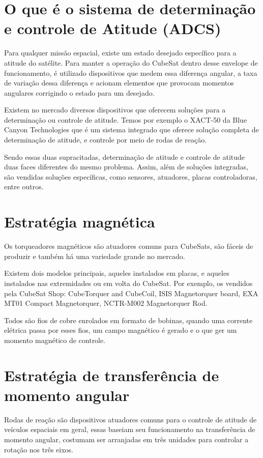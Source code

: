 \section{O que é o sistema de determinação e controle de Atitude (ADCS)}\label{sec:O que é o sistema de determinação e controle de Atitude (ADCS)}

Para qualquer missão espacial, existe um estado desejado específico para a atitude do satélite. Para manter a operação do CubeSat dentro desse envelope de funcionamento, é utilizado dispositivos que medem essa diferença angular, a taxa de variação dessa diferença e acionam elementos que provocam momentos angulares corrigindo o estado para um desejado.

Existem no mercado diversos dispositivos que oferecem soluções para a determinação ou controle de atitude. Temos por exemplo o XACT-50 da Blue Canyon Technologies que é um sistema integrado que oferece solução completa de determinação de atitude, e controle por meio de rodas de reação.

Sendo essas duas supracitadas, determinação de atitude e controle de atitude duas faces diferentes do mesmo problema. Assim, além de soluções integradas, são vendidas soluções específicas, como sensores, atuadores, placas controladoras, entre outros.

\section{Estratégia magnética}\label{sec:Estratégia magnética}
Os torqueadores magnéticos são atuadores comuns para CubeSats, são fáceis de produzir e também há uma variedade grande no mercado.

Existem dois modelos principais, aqueles instalados em placas, e aqueles instalados nas extremidades ou em volta do CubeSat. Por exemplo, os vendidos pela CubeSat Shop: CubeTorquer and CubeCoil, ISIS Magnetorquer board, EXA MT01 Compact Magnetorquer, NCTR-M002 Magnetorquer Rod. 

Todos são fios de cobre enrolados em formato de bobinas, quando uma corrente elétrica passa por esses fios, um campo magnético é gerado e o que ger um momento magnético de controle.

\section{Estratégia de transferência de momento angular}\label{sec:Estratégia de transferência de momento angular}
Rodas de reação são dispositivos atuadores comuns para o controle de atitude de veículos espaciais em geral, essas  baseiam seu funcionamento na  transferência de momento angular, costumam ser arranjadas em três unidades para controlar a rotação nos três eixos.

